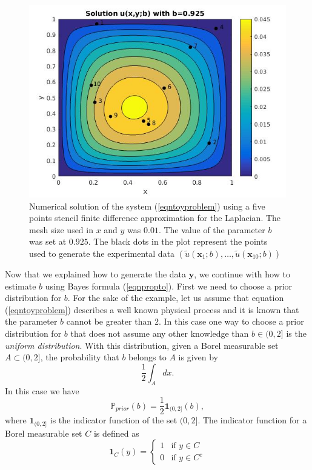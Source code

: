 \documentclass[12pt]{book}
\newcommand{\prior}{\mathbb{P}_{prior}}
\newcommand{\x}{\textbf{x}}
\newcommand{\y}{\textbf{y}}
\begin{document}
\begin{figure}[H]
\centering
\includegraphics[scale=0.5]{./FigChap3/solu}
\caption{Numerical solution of the system (\ref{eqntoyproblem}) using a five points stencil finite difference
approximation for the Laplacian. The mesh
size used in $x$ and $y$ was $0.01$. The value of the parameter $b$ was set at $0.925$. The black dots
in the plot represent the points used to generate the experimental data 
$(\tilde{u}(\x_{1};b),\ldots,\tilde{u}(\x_{10};b))$}
\label{figsolU}
\end{figure}
Now that we explained how to generate the data $\y$, we  continue with how to estimate $b$   using Bayes formula (\ref{eqnpropto}).
First we need to choose a prior distribution for $b$. For the sake of the example, let us assume that 
equation (\ref{eqntoyproblem}) describes a well known physical process and it is known that
the parameter $b$ cannot be greater than $2$. In this case one way to choose a prior distribution
for $b$ that does not assume any other knowledge than $b\in (0,2]$ is the \textit{uniform distribution}. 
With this distribution, given a Borel measurable set $A\subset(0,2]$, the probability that $b$ belongs to $A$ is given by
\begin{equation*}
\frac{1}{2}\int_{A}dx.
\end{equation*}
In this case we have 
\begin{equation}\label{eqnpriortoyproblem}
\prior(b)=\frac{1}{2}\textbf{1}_{(0,2]}(b),
\end{equation}
where $\textbf{1}_{(0,2]}$ is the indicator function of the set $(0,2]$. The indicator function for a Borel measurable set $C$ is
defined as
\begin{equation*}
\textbf{1}_{C}(y)=\left\{
	\begin{array}{ll}
		1 & \mbox{if }	y\in C\\
		0 & \mbox{if }   y\in C^{c}
	\end{array}
\right.
\end{equation*}
\end{document}
